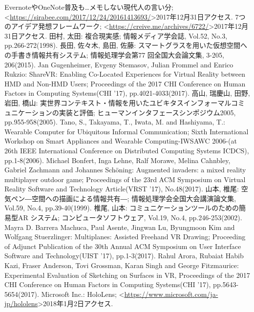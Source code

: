 \documentclass[11pt,a4j, titlepage]{jarticle} %
\begin{document}
\newpage
\begin{thebibliography}{数字}
   EvernoteやOneNote普及も…メモしない現代人の言い分; \textless\url{https://sirabee.com/2017/12/24/20161413693/}\textgreater2017年12月31日アクセス.
   7つのアイデア発想フレームワーク; \textless\url{https://creive.me/archives/6722/}\textgreater2017年12月31日アクセス.
   田村, 太田: 複合現実感; 情報メディア学会誌, Vol.52, No.3, pp.266-272(1998).
   長田, 佐々木, 島田, 佐藤: スマートグラスを用いた仮想空間への手書き情報共有システム; 情報処理学会第77 回全国大会論文集, 3-205, 206(2015).
   	Jan Gugenheimer, Evgeny Stemasov, Julian Frommel and Enrico Rukzio: ShareVR: Enabling Co-Located Experiences for Virtual Reality between HMD and Non-HMD Users; Proceedings of the 2017 CHI Conference on Human Factors in Computing Systems(CHI '17), pp.4021-4033(2017).
   高山, 瑞慶山, 田野, 岩田, 橋山: 実世界コンテキスト・情報を用いたユビキタスインフォーマルコミュニケーションの実装と評価; ヒューマンインタフェースシンポジウム2005, pp.955-958(2005).
   Tano, S., Takayama, T., Iwata, M. and Hashiyama, T.: Wearable Computer for Ubiquitous Informal Communication; Sixth International Workshop on Smart Appliances and Wearable Computing-IWSAWC 2006-(at 26th IEEE International Conference on Distributed Computing Systems
ICDCS), pp.1-8(2006).
   Michael Bonfert, Inga Lehne, Ralf Morawe, Melina Cahnbley, Gabriel Zachmann and Johannes Sch\"oning: Augmented invaders: a mixed reality multiplayer outdoor game; Proceedings of the 23rd ACM Symposium on Virtual Reality Software and Technology Article(VRST '17), No.48(2017).
   山本, 椎尾: 空気ペン―空間への描画による情報共有―; 情報処理学会全国大会講演論文集, Vol.59, No.4, pp.39-40(1999).
   椎尾, 山本: コミュニケーションツールのための簡易型AR システム; コンピュータソフトウェア, Vol.19, No.4, pp.246-253(2002).
   Mayra D. Barrera Machuca, Paul Asente, Jingwan Lu, Byungmoon Kim and Wolfgang Stuerzlinger: Multiplanes: Assisted Freehand VR Drawing; Proceeding of Adjunct Publication of the 30th Annual ACM Symposium on User Interface Software and Technology(UIST '17), pp.1-3(2017).
   Rahul Arora, 	Rubaiat Habib Kazi, 	Fraser Anderson, Tovi Grossman, Karan Singh and George Fitzmaurice: Experimental Evaluation of Sketching on Surfaces in VR, Proceedings of the 2017 CHI Conference on Human Factors in Computing Systems(CHI '17), pp.5643-5654(2017).
   Microsoft Inc.: HoloLens; \textless\url{https://www.microsoft.com/ja-jp/hololens}\textgreater2018年1月2日アクセス.

\end{thebibliography}
\end{document}
